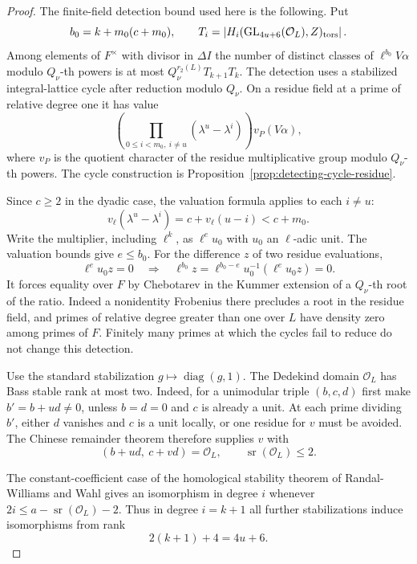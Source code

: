 \begin{proof}

The finite-field detection bound used here is the following.
Put
\[
 b_0=k+m_0(c+m_0),\qquad
 T_i=\left|H_i(\mathrm{GL}_{4u+6}(\mathcal O_L),Z)_{\mathrm{tors}}\right|.
\]
Among elements of \(F^\times\) with divisor in \(\Delta I\)
the number of distinct classes of \(\ell^{b_0}V\alpha\)
modulo \(Q_\nu\)-th powers is at most
\(Q_\nu^{r_2(L)}T_{k+1}T_k\). The detection uses a
stabilized integral-lattice cycle after reduction modulo
\(Q_\nu\). On a residue field at a prime of relative degree
one it has value
\[
    \left(\prod_{0\le i<m_0,\ i\ne u}
                   (\lambda^u-\lambda^i)\right)v_P(V\alpha),
\]
where \(v_P\) is the quotient character of the residue
multiplicative group modulo \(Q_\nu\)-th powers.
The cycle construction is Proposition~\ref{prop:detecting-cycle-residue}.

Since \(c\ge2\) in the dyadic case, the valuation formula
applies to each \(i\ne u\):
\[
    v_\ell(\lambda^u-\lambda^i)=c+v_\ell(u-i)<c+m_0 .
\]
Write the multiplier, including \(\ell^k\), as \(\ell^e u_0\) with \(u_0\) an \(\ell\)-adic unit. The valuation bounds give \(e\le b_0\). For the difference \(z\) of two residue evaluations,
\[
 \ell^e u_0 z=0\quad\Longrightarrow\quad
 \ell^{b_0}z=\ell^{b_0-e}u_0^{-1}(\ell^e u_0z)=0 .
\]
It forces equality over \(F\) by Chebotarev in the Kummer
extension of a \(Q_\nu\)-th root of the ratio. Indeed a
nonidentity Frobenius there precludes a root in the
residue field, and primes of relative degree greater
than one over \(L\) have density zero among primes of
\(F\). Finitely many primes at which the cycles fail to
reduce do not change this detection.


Use the standard stabilization \(g\mapsto\operatorname{diag}(g,1)\). The Dedekind domain \(\mathcal O_L\) has Bass stable rank at most two. Indeed, for a unimodular triple \((b,c,d)\) first make \(b'=b+ud\ne0\), unless \(b=d=0\) and \(c\) is already a unit. At each prime dividing \(b'\), either \(d\) vanishes and \(c\) is a unit locally, or one residue for \(v\) must be avoided. The Chinese remainder theorem therefore supplies \(v\) with
\[
      (b+ud,\ c+vd)=\mathcal O_L,\qquad
        \operatorname{sr}(\mathcal O_L)\le2 .
\]

The constant-coefficient case of the homological stability theorem of Randal-Williams and Wahl \cite[Theorem~5.11]{rw-wahl-stability} gives an isomorphism in degree \(i\) whenever \(2i\le a-\operatorname{sr}(\mathcal O_L)-2\). Thus in degree \(i=k+1\) all further stabilizations induce isomorphisms from rank
\[
 2(k+1)+4=4u+6.
\]


\end{proof}
